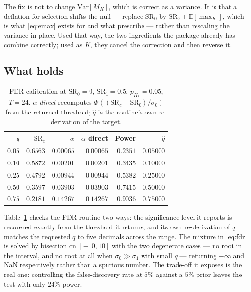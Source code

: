 \documentclass[11pt,a4paper]{article}
\newcommand{\SR}{\mathrm{SR}}
\begin{document}
The fix is not to change $\mathrm{Var}[M_K]$, which is correct as a variance.
It is that a deflation for selection shifts the null --- replace $\SR_0$ by
$\SR_0 + \mathbb{E}[\max_K]$, which is what \eqref{eq:emax} exists for and
what \citet{bailey2014} prescribe --- rather than rescaling the variance in
place. Used that way, the two ingredients the package already has combine
correctly; used as $K$, they cancel the correction and then reverse it.

\subsection{What holds}

\begin{table}[t]
\centering
\caption{FDR calibration at $\SR_0 = 0$, $\SR_1 = 0.5$, $p_{H_1} = 0.05$,
$T = 24$. \emph{$\alpha$ direct} recomputes
$\overline{\Phi}((\SR_c - \SR_0)/\sigma_0)$ from the returned threshold;
$\hat q$ is the routine's own re-derivation of the target.}
\label{tab:fdr}
\begin{tabular}{rrrrrr}
\toprule
$q$ & $\SR_c$ & $\alpha$ & $\alpha$ direct & Power & $\hat q$ \\
\midrule
$0.05$ & $0.6563$ & $0.00065$ & $0.00065$ & $0.2351$ & $0.05000$ \\
$0.10$ & $0.5872$ & $0.00201$ & $0.00201$ & $0.3435$ & $0.10000$ \\
$0.25$ & $0.4792$ & $0.00944$ & $0.00944$ & $0.5382$ & $0.25000$ \\
$0.50$ & $0.3597$ & $0.03903$ & $0.03903$ & $0.7415$ & $0.50000$ \\
$0.75$ & $0.2181$ & $0.14267$ & $0.14267$ & $0.9036$ & $0.75000$ \\
\bottomrule
\end{tabular}
\end{table}

Table~\ref{tab:fdr} checks the FDR routine two ways: the significance level it
reports is recovered exactly from the threshold it returns, and its own
re-derivation of $q$ matches the requested $q$ to five decimals across the
range. The mixture in \eqref{eq:fdr} is solved by bisection on
$[-10, 10]$ with the two degenerate cases --- no root in the interval, and no
root at all when $\sigma_0 \gg \sigma_1$ with small $q$ --- returning
$-\infty$ and NaN respectively rather than a spurious number. The trade-off it
exposes is the real one: controlling the false-discovery rate at $5\%$ against
a $5\%$ prior leaves the test with only $24\%$ power.
\end{document}
